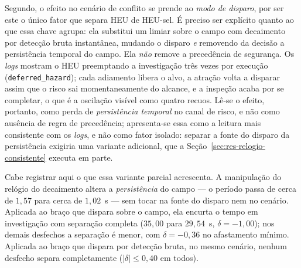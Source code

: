 Segundo, o efeito no cenário de conflito se prende ao \emph{modo de disparo}, por ser
este o único fator que separa HEU de HEU-sel. É preciso ser explícito quanto ao que
essa chave agrupa: ela substitui um limiar sobre o campo com decaimento por detecção
bruta instantânea, mudando o disparo \emph{e} removendo da decisão a persistência
temporal do campo. Ela \emph{não} remove a precedência de segurança. Os \textit{logs}
mostram o HEU preemptando a investigação três vezes por execução
(\texttt{deferred\_hazard}); cada adiamento libera o alvo, a atração volta a disparar
assim que o risco sai momentaneamente do alcance, e a inspeção acaba por se completar, o que é a oscilação visível como quatro recuos. Lê-se o efeito, portanto, como
perda de \emph{persistência temporal} no canal de risco, e não como ausência de regra
de precedência; apresenta-se essa como a leitura mais consistente com os
\textit{logs}, e não como fator isolado: separar a fonte do disparo da persistência
exigiria uma variante adicional, que a Seção~\ref{sec:res-relogio-consistente} executa
em parte.

Cabe registrar aqui o que essa variante parcial acrescenta. A manipulação do relógio do
decaimento altera a \emph{persistência} do campo --- o período passa de cerca de
$1{,}57$ para cerca de $1{,}02$~s --- sem tocar na fonte do disparo nem no cenário. Aplicada ao
braço que dispara sobre o campo, ela encurta o tempo em investigação com separação
completa ($35{,}00$ para $29{,}54$~s, $\delta=-1{,}00$); nos demais desfechos a
separação é menor, com $\delta=-0{,}36$ no afastamento mínimo. Aplicada ao braço que
dispara por detecção bruta, no mesmo cenário, nenhum desfecho separa completamente
($|\delta|\leq0{,}40$ em todos).

